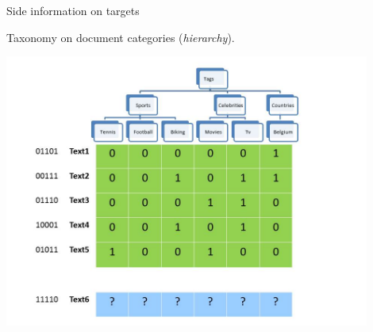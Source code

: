 \documentclass[11pt,compress,t,notes=noshow, xcolor=table]{beamer}
\begin{document}
\begin{vbframe}{Side information on targets}
\begin{itemize}
            \begin{minipage}{0.45\textwidth}   
                \item Taxonomy on document categories (\emph{hierarchy}).
            \end{minipage}
            \hfill
            \begin{minipage}{0.4\textwidth}    
                \begin{center}  	
                    \includegraphics[width=0.9\textwidth,trim = 0 0 100 20,clip]{figure/Slide5}	
                \end{center}
            \end{minipage}
            

\end{itemize}
\end{vbframe}
\end{document}
